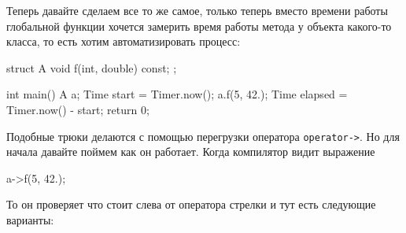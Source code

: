 Теперь давайте сделаем все то же самое, только теперь вместо времени работы глобальной функции хочется замерить время работы метода у объекта какого-то класса, то есть хотим автоматизировать процесс:
\begin{cppcode}
struct A {
  void f(int, double) const;
};

int main() {
  A a;
  Time start = Timer.now();
  a.f(5, 42.);
  Time elapsed = Timer.now() - start;
  return 0;
}
\end{cppcode}
Подобные трюки делаются с помощью перегрузки оператора \verb"operator->".
Но для начала давайте поймем как он работает.
Когда компилятор видит выражение
\begin{cppcode}
a->f(5, 42.);
\end{cppcode}
То он проверяет что стоит слева от оператора стрелки и тут есть следующие варианты:
